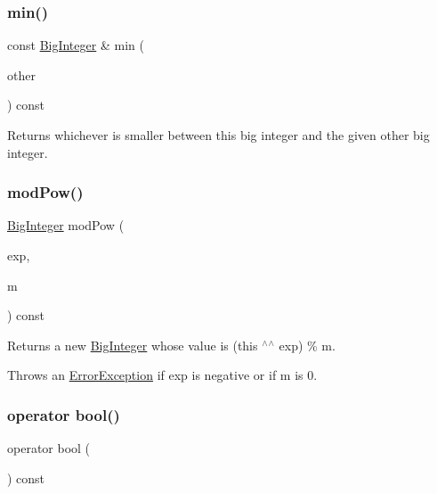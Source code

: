 \subsubsection{\texorpdfstring{min()}{min()}}
{\footnotesize\ttfamily const \mbox{\hyperlink{classBigInteger}{Big\+Integer}} \& min (\begin{DoxyParamCaption}\item[{const \mbox{\hyperlink{classBigInteger}{Big\+Integer}} \&}]{other }\end{DoxyParamCaption}) const}



Returns whichever is smaller between this big integer and the given other big integer. 

\mbox{\label{classBigInteger_a0784fc13afdca5e439e2cb99dc2b1055}} 
\subsubsection{\texorpdfstring{mod\+Pow()}{modPow()}}
{\footnotesize\ttfamily \mbox{\hyperlink{classBigInteger}{Big\+Integer}} mod\+Pow (\begin{DoxyParamCaption}\item[{const \mbox{\hyperlink{classBigInteger}{Big\+Integer}} \&}]{exp,  }\item[{const \mbox{\hyperlink{classBigInteger}{Big\+Integer}} \&}]{m }\end{DoxyParamCaption}) const}



Returns a new \mbox{\hyperlink{classBigInteger}{Big\+Integer}} whose value is (this $^\wedge$$^\wedge$ exp) \% m. 

Throws an \mbox{\hyperlink{classErrorException}{Error\+Exception}} if exp is negative or if m is 0. \mbox{\label{classBigInteger_a67b76affb3b5d35fa419ac234144038b}} 
\subsubsection{\texorpdfstring{operator bool()}{operator bool()}}
{\footnotesize\ttfamily operator bool (\begin{DoxyParamCaption}{ }\end{DoxyParamCaption}) const\hspace{0.3cm}{\ttfamily [explicit]}}



